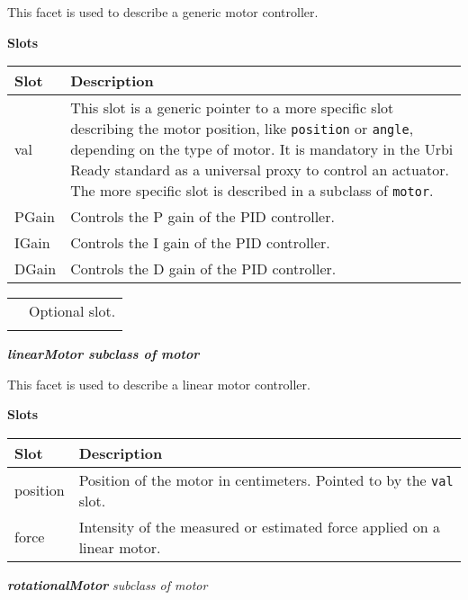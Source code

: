 \documentclass[a4paper]{article}
\begin{document}
{\sffamily
This facet is used to describe a generic motor controller.}

{\sffamily\bfseries
Slots}

\begin{flushleft}
\tablehead{}
\begin{supertabular}{|m{2.8669999cm}|m{12.422cm}|}
\hline
\sffamily\bfseries Slot &
\sffamily\bfseries Description\\\hline
val &
\sffamily This slot is a generic pointer to a
more specific slot describing the motor position, like
\texttt{position} or \texttt{angle}, depending on the type of motor. It
is mandatory in the Urbi Ready standard as a universal proxy to control
an actuator. The more specific slot is described in a subclass of
\texttt{motor}.\\\hline
PGain &
\sffamily Controls the P gain of the PID
controller.\\\hline
IGain &
\sffamily Controls the I gain of the PID
controller.\\\hline
DGain &
\sffamily Controls the D gain of the PID
controller.\\\hline
\end{supertabular}
\end{flushleft}
\begin{flushleft}
\tablehead{}
\begin{supertabular}{|m{1.717cm}|m{10.464cm}}
\hhline{-~}
 &
\sffamily Optional slot.\\\hhline{-~}
\end{supertabular}
\end{flushleft}
{\sffamily\bfseries\itshape
 linearMotor  \textmd{subclass of motor}}

{\sffamily
This facet is used to describe a linear motor controller.}

{\sffamily\bfseries
Slots}

\begin{flushleft}
\tablehead{}
\begin{supertabular}{|m{2.8669999cm}|m{12.422cm}|}
\hline
\sffamily\bfseries Slot &
\sffamily\bfseries Description\\\hline
position &
\sffamily Position of the motor in centimeters.
Pointed to by the \texttt{val} slot.\\\hline
force &
\sffamily Intensity of the measured or estimated
force applied on a linear motor.\\\hline
\end{supertabular}
\end{flushleft}
{
     \textsf{\textbf{\textit{rotationalMotor}}}
\textsf{\textit{subclass of motor}}}
\end{document}
